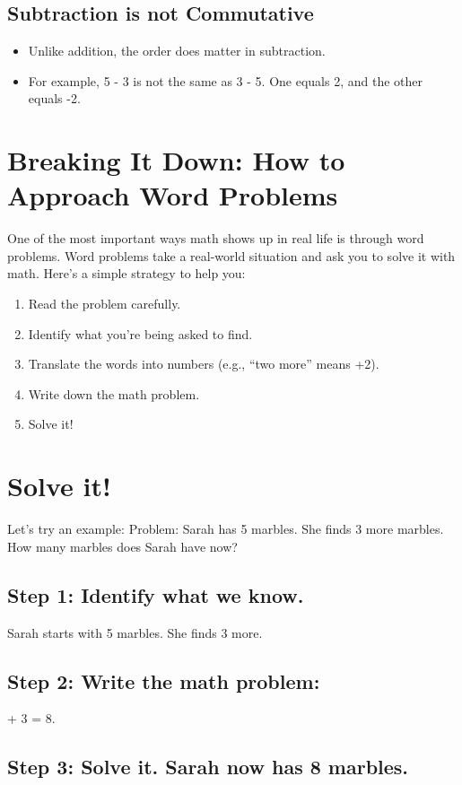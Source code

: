 \documentclass{book}
\begin{document}
\subsection{Subtraction is not Commutative}
\begin{itemize}
	\item Unlike addition, the order does matter in subtraction.
	\item For example, 5 - 3 is not the same as 3 - 5. One equals 2, and the other equals -2.
\end{itemize}

\section{Breaking It Down: How to Approach Word Problems}
One of the most important ways math shows up in real life is through word problems. Word problems take a real-world situation and ask you to solve it with math.
Here’s a simple strategy to help you:
\begin{enumerate}
	\item Read the problem carefully.
	\item Identify what you’re being asked to find.
	\item Translate the words into numbers (e.g., “two more” means +2).
	\item Write down the math problem.
	\item Solve it!
\end{enumerate}
\section{Solve it!}
Let’s try an example:
Problem: Sarah has 5 marbles. She finds 3 more marbles. How many marbles does Sarah have now?
\subsection{Step 1: Identify what we know.}
Sarah starts with 5 marbles.
\indent She finds 3 more.
\subsection{Step 2: Write the math problem:}
 + 3 = 8.
\subsection{Step 3: Solve it. Sarah now has 8 marbles.}
\end{document}
